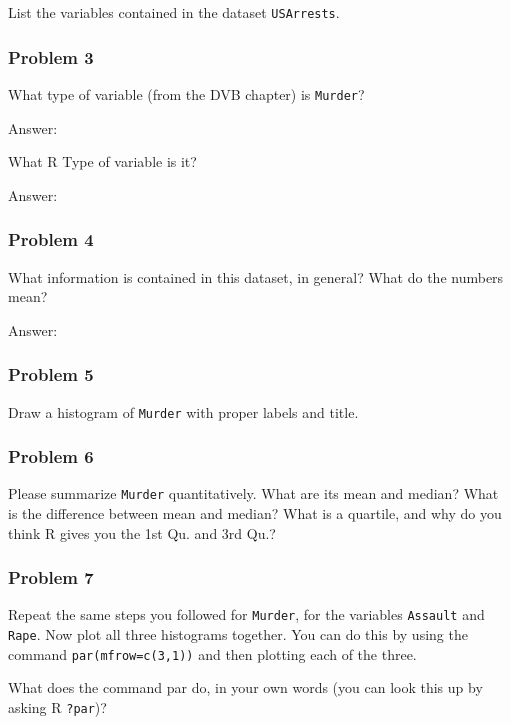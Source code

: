 \documentclass[
]{article}
\begin{document}
List the variables contained in the dataset \texttt{USArrests}.

\hypertarget{problem-3}{%
\subsubsection{Problem 3}\label{problem-3}}

What type of variable (from the DVB chapter) is \texttt{Murder}?

Answer:

What R Type of variable is it?

Answer:

\hypertarget{problem-4}{%
\subsubsection{Problem 4}\label{problem-4}}

What information is contained in this dataset, in general? What do the
numbers mean?

Answer:

\hypertarget{problem-5}{%
\subsubsection{Problem 5}\label{problem-5}}

Draw a histogram of \texttt{Murder} with proper labels and title.

\hypertarget{problem-6}{%
\subsubsection{Problem 6}\label{problem-6}}

Please summarize \texttt{Murder} quantitatively. What are its mean and
median? What is the difference between mean and median? What is a
quartile, and why do you think R gives you the 1st Qu. and 3rd Qu.?

\hypertarget{problem-7}{%
\subsubsection{Problem 7}\label{problem-7}}

Repeat the same steps you followed for \texttt{Murder}, for the
variables \texttt{Assault} and \texttt{Rape}. Now plot all three
histograms together. You can do this by using the command
\texttt{par(mfrow=c(3,1))} and then plotting each of the three.

What does the command par do, in your own words (you can look this up by
asking R \texttt{?par})?
\end{document}
